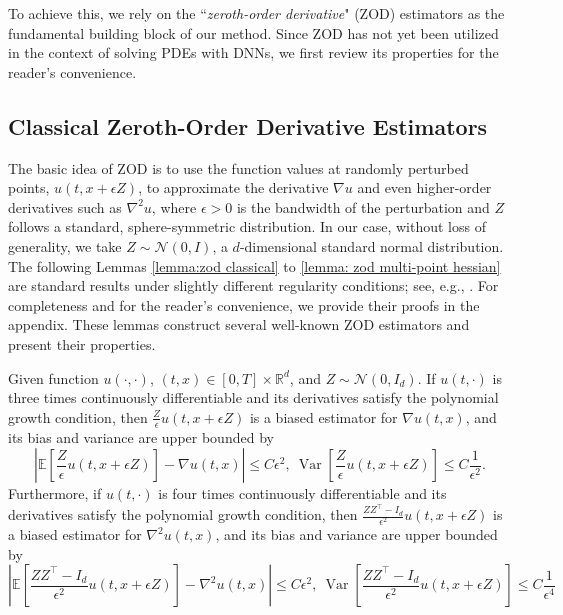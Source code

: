 \documentclass[twoside,11pt]{article}
\newcommand{\E}{\mathbb{E}}
\newcommand{\R}{\mathbb{R}}
\newcommand{\1}{\mathbf{1}}
\numberwithin{equation}{section}
\begin{document}
To achieve this, we rely on the ``\textit{zeroth-order derivative}" (ZOD) estimators as the fundamental building block of our method. Since ZOD has not yet been utilized in the context of solving PDEs with DNNs, we first review its properties for the reader's convenience.







\subsection{Classical Zeroth-Order Derivative Estimators}




The basic idea of ZOD is to use the function values at randomly perturbed points, $u(t,x+\epsilon Z)$, to approximate the derivative $\nabla u$ and even higher-order derivatives such as $\nabla^2 u$, where $\epsilon > 0$ is the bandwidth of the perturbation and $Z$ follows a standard, sphere-symmetric distribution. In our case, without loss of generality, we take $Z \sim \mathcal N(0,I)$, a $d$-dimensional standard normal distribution. The following Lemmas \ref{lemma:zod classical} to \ref{lemma: zod multi-point hessian} are standard results under slightly different regularity conditions; see, e.g., \citet{nesterov2017Random,balasubramanian2022ZerothOrder}. For completeness and for the reader's convenience, we provide their proofs in the appendix. These lemmas construct several well-known ZOD estimators and present their properties.

\begin{lemma}
\label{lemma:zod classical}
Given function $u(\cdot,\cdot)$, $ (t,x)\in [0,T]\times \R^d$, and $ Z \sim \mathcal{N}(0,I_d)$. If $ u(t,\cdot) $ is three times continuously differentiable and its derivatives satisfy the polynomial growth condition,
then $\frac{Z}{\epsilon} u(t,x+\epsilon Z)$ is a biased estimator for $\nabla u(t,x)$, and its bias and variance are upper bounded by
\[ \left| \E\left[ \frac{Z}{\epsilon} u(t,x+\epsilon Z)  \right] -\nabla u(t,x) \right| \leq C\epsilon^2,\ \operatorname{Var}\left[\frac{Z}{\epsilon} u(t,x+\epsilon Z) \right] \leq C\frac{1}{\epsilon^2} .  \]
Furthermore, if $ u(t,\cdot)$ is four times continuously differentiable and its derivatives satisfy the polynomial growth condition,
then $ \frac{ZZ^{\top}- I_d}{\epsilon^2}u(t,x+\epsilon Z)$ is a biased estimator for $\nabla^2 u(t,x)$, and its bias and variance are upper bounded by
\begin{equation}
    \left|\E\left[\frac{ZZ^{\top}- I_d}{\epsilon^2}u(t,x+\epsilon Z) \right]- \nabla^2 u(t,x)\right| \le C\epsilon^2,\  \operatorname{Var}\left[ \frac{ZZ^{\top}- I_d}{\epsilon^2}u(t,x+\epsilon Z)\right] \le C\frac{1}{\epsilon^4}
\end{equation}
\end{lemma}
\end{document}

